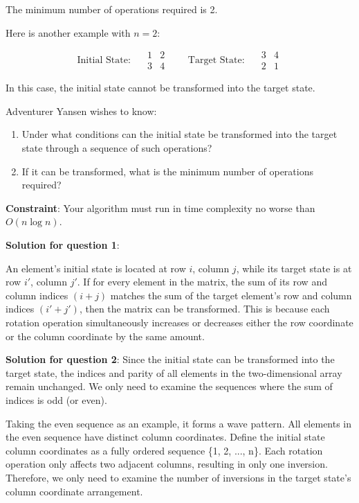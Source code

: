 \noindent The minimum number of operations required is 2.

\vspace{1\baselineskip}

\noindent Here is another example with $n=2$:

\[
\text{Initial State: }\quad 
\begin{array}{ccc}
1 & 2 \\
3 & 4
\end{array}
\qquad
\text{Target State: }\quad
\begin{array}{ccc}
3 & 4 \\
2 & 1
\end{array}
\]

\noindent In this case, the initial state cannot be transformed into the target state.

\newpage

\noindent Adventurer Yansen wishes to know:  
\begin{enumerate}
  \item Under what conditions can the initial state be transformed into the target state through a sequence of such operations?
  \item If it can be transformed, what is the minimum number of operations required?
\end{enumerate}

\noindent \textbf{Constraint}: Your algorithm must run in time complexity no worse than $O(n \log n)$.

\noindent \textbf{Solution for question 1}:

An element's initial state is located at row $i$, column $j$, 
while its target state is at row $i'$, column $j'$. 
If for every element in the matrix, the sum of its row and column indices $(i+j)$ matches the sum of the target element's row 
and column indices $(i'+j')$, then the matrix can be transformed. 
This is because each rotation operation simultaneously increases or decreases either the row coordinate or the column coordinate by the same amount. 

\noindent \textbf{Solution for question 2}:
Since the initial state can be transformed into the target state, 
the indices and parity of all elements in the two-dimensional array remain unchanged.
We only need to examine the sequences where the sum of indices is odd (or even).

Taking the even sequence as an example, it forms a wave pattern.
 All elements in the even sequence have distinct column coordinates.
  Define the initial state column coordinates as a fully ordered sequence \{1, 2, ..., n\}.
 Each rotation operation only affects two adjacent columns, resulting in only one inversion.
 Therefore, we only need to examine the number of inversions in the target state's column coordinate arrangement.

